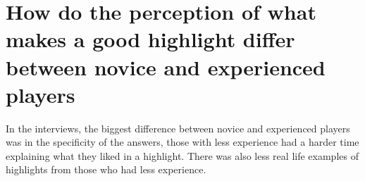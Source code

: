 \section{How do the perception of what makes a good highlight differ between novice and experienced players}
In the interviews, the biggest difference between novice and experienced players was in the specificity of the answers, those with less experience had a harder time explaining what they liked in a highlight. There was also less real life examples of highlights from those who had less experience.

